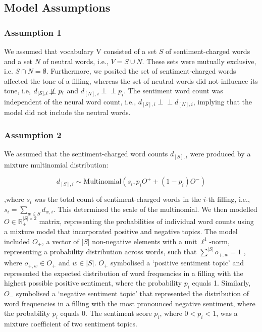 \documentclass[logo,bsc,singlespacing,parskip]{infthesis}
\begin{document}
\subsection{Model Assumptions}
\subsubsection{Assumption 1}
We assumed that vocabulary V consisted of a set $S$ of sentiment-charged words and a set $N$ of neutral words, i.e., $V = S \cup N$. These sets were mutually exclusive, i.e. $S \cap N = \emptyset
$. Furthermore, we posited the set of sentiment-charged words affected the tone of a filling, whereas the set of neutral words did not influence its tone, i.e, $ d_{[S], i} \not\!\perp\!\!\!\perp
 p_i$ and $ d_{[N], i} \perp \!\!\! \perp p_i$. The sentiment word count was independent of the neural word count, i.e., $d_{[S], i} \perp \!\!\! \perp d_{[N], i}$, implying that the model did not include the neutral words. 
\subsubsection{Assumption 2}
We assumed that the sentiment-charged word counts $d_{[S],i}$ were produced by a mixture multinomial distribution: 

\begin{equation} \label{eu_eqn}
d_{[S],i} \sim \text{Multinomial} \left( s_{i}, p_{i}O^{+} + (1 - p_{i})O^{-} \right)
\end{equation}

,where $s_i$ was the total count of sentiment-charged words in the $i$-th filling, i.e., $s_i = \sum_{w \in S} d_{w,i}$. This determined the scale of the multinomial. We then modelled $O \in \mathbb{R}^{|S| \times 2}_+$ matrix, representing the probabilities of individual word counts using a mixture model that incorporated positive and negative topics. The model included $O_+$, a vector of $|S|$ non-negative elements with a unit $\ell^1$-norm, representing a probability distribution across words, such that $\sum_{}^{|S|} o_{+,w} = 1$
, where $o_{+,w} \in O_+$ and  $w \in |S|$. $O_+$  symbolised a ‘positive sentiment topic’ and represented the expected distribution of word frequencies in a filling with the highest possible positive sentiment, where the probability $p_i$ equals 1. Similarly, $O_-$ symbolised a ‘negative sentiment topic’ that represented the distribution of word frequencies in a filling with the most pronounced negative sentiment, where the probability $p_i$ equals 0. The sentiment score $p_i$, where $0 < p_i <1$, was a mixture coefficient of two sentiment topics.
\end{document}
